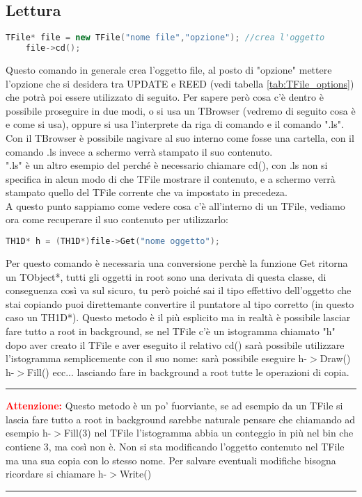\subsection{Lettura}
\begin{lstlisting}[language=C++,label={cod1},mathescape=true,breaklines=true]
	TFile* file = new TFile("nome file","opzione"); //crea l'oggetto
	file->cd();
\end{lstlisting}
Questo comando in generale crea l'oggetto file, al posto di "opzione" mettere l'opzione che si desidera tra UPDATE e REED (vedi tabella \ref{tab:TFile_options}) che potrà poi essere utilizzato di seguito. Per sapere però cosa c'è dentro è possibile proseguire in due modi, o si usa un TBrowser (vedremo di seguito cosa è e come si usa), oppure si usa l'interprete da riga di comando e il comando ".ls". Con il TBrowser è possibile nagivare al suo interno come fosse una cartella, con il comando .ls invece a schermo verrà stampato il suo contenuto.\\
".ls" è un altro esempio del perché è necessario chiamare cd(), con .ls non si specifica in alcun modo di che TFile mostrare il contenuto, e a schermo verrà stampato quello del TFile corrente che va impostato in precedeza.\\
A questo punto sappiamo come vedere cosa c'è all'interno di un TFile, vediamo ora come recuperare il suo contenuto per utilizzarlo:
\begin{lstlisting}[language=C++,label={cod1},mathescape=true,breaklines=true]
	TH1D* h = (TH1D*)file->Get("nome oggetto");
\end{lstlisting}
Per questo comando è necessaria una conversione perchè la funzione Get ritorna un TObject*, tutti gli oggetti in root sono una derivata di questa classe, di conseguenza così va sul sicuro, tu però poiché sai il tipo effettivo dell'oggetto che stai copiando puoi direttemante convertire il puntatore al tipo corretto (in questo caso un TH1D*).
Questo metodo è il più esplicito ma in realtà è possibile lasciar fare tutto a root in background, se nel TFile c'è un istogramma chiamato "h" dopo aver creato il TFile e aver eseguito il relativo cd() sarà possibile utilizzare l'istogramma semplicemente con il suo nome: sarà possibile eseguire h-$>$Draw() h-$>$Fill() ecc... lasciando fare in background a root tutte le operazioni di copia.
{\color{red} \rule{\linewidth}{0.5mm}}
\textcolor{red}{\textbf{Attenzione:}} Questo metodo è un po' fuorviante, se ad esempio da un TFile si lascia fare tutto a root in background sarebbe naturale pensare che chiamando ad esempio h-$>$Fill(3) nel TFile l'istogramma abbia un conteggio in più nel bin che contiene 3, ma così non è. Non si sta modificando l'oggetto contenuto nel TFile ma una sua copia con lo stesso nome. Per salvare eventuali modifiche bisogna ricordare si chiamare h-$>$Write()\\
{\color{red} \rule{\linewidth}{0.5mm}}

